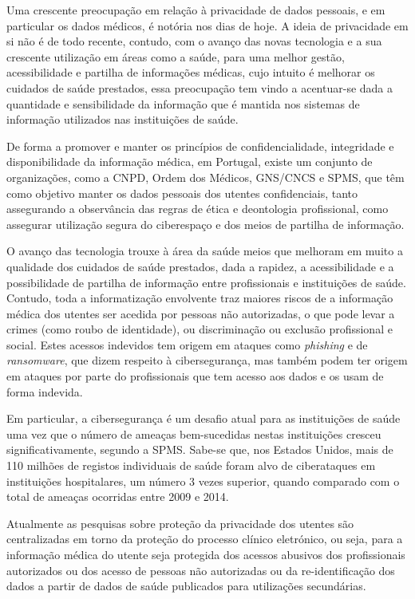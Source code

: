 \documentclass[conference]{IEEEtran}
\begin{document}
Uma crescente preocupação em relação à privacidade de dados pessoais, e em particular os dados médicos, é notória nos dias de hoje. A ideia de privacidade em si não é de todo recente, contudo, com o avanço das novas tecnologia e a sua crescente utilização em áreas como a saúde, para uma melhor gestão, acessibilidade e partilha de informações médicas, cujo intuito é melhorar os cuidados de saúde prestados, essa preocupação tem vindo a acentuar-se dada a quantidade e sensibilidade da informação que é mantida nos sistemas de informação utilizados nas instituições de saúde.

De forma a promover e manter os princípios de confidencialidade, integridade e disponibilidade da informação médica, em Portugal, existe um conjunto de organizações, como a CNPD, Ordem dos Médicos, GNS/CNCS e SPMS, que têm como objetivo manter os dados pessoais dos utentes confidenciais, tanto assegurando a observância das regras de ética e deontologia profissional, como assegurar utilização segura do ciberespaço e dos meios de partilha de informação.

O avanço das tecnologia trouxe à área da saúde meios que melhoram em muito a qualidade dos cuidados de saúde prestados, dada a rapidez, a acessibilidade e a possibilidade de partilha de informação entre profissionais e instituições de saúde. Contudo, toda a informatização envolvente traz maiores riscos de a informação médica dos utentes ser acedida por pessoas não autorizadas, o que pode levar a crimes (como roubo de identidade), ou discriminação ou exclusão profissional e social. Estes acessos indevidos tem origem em ataques como \textit{phishing} e de \textit{ransomware}, que dizem respeito à cibersegurança, mas também podem ter origem em ataques por parte do profissionais que tem acesso aos dados e os usam de forma indevida.

Em particular, a cibersegurança é um desafio atual para as instituições de saúde uma vez que o número de ameaças bem-sucedidas nestas instituições cresceu significativamente, segundo a SPMS. Sabe-se que, nos Estados Unidos, mais de 110 milhões de registos individuais de saúde foram alvo de ciberataques em instituições hospitalares, um número 3 vezes superior, quando comparado com o total de ameaças ocorridas entre 2009 e 2014.

Atualmente as pesquisas sobre proteção da privacidade dos utentes são centralizadas em torno da proteção do processo clínico eletrónico, ou seja, para a informação médica do utente seja protegida dos acessos abusivos dos profissionais autorizados ou dos acesso de pessoas não autorizadas ou da re-identificação dos dados a partir de dados de saúde publicados para utilizações secundárias.
\end{document}
